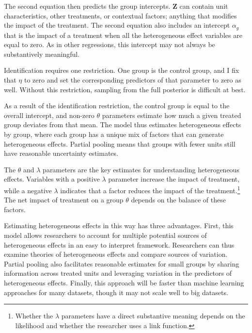 \documentclass[12pt]{article}
\begin{document}
The second equation then predicts the group intercepts. 
\textbf{Z} can contain unit characteristics, other treatments, or contextual factors; anything that modifies the impact of the treatment. 
The second equation also includes an intercept $\alpha_g$ that is the impact of a treatment when all the heterogeneous effect variables are equal to zero.
As in other regressions, this intercept may not always be substantively meaningful.  


Identification requires one restriction. 
One group is the control group, and I fix that $\eta$ to zero and set the corresponding predictors of that parameter to zero as well. 
Without this restriction, sampling from the full posterior is difficult at best. 


As a result of the identification restriction, the control group is equal to the overall intercept, and non-zero $\theta$ parameters estimate how much a given treated group deviates from that mean. 
The model thus estimates heterogeneous effects by group, where each group has a unique mix of factors that can generate heterogeneous effects. 
Partial pooling means that groups with fewer units still have reasonable uncertainty estimates. 


The $\theta$ and $\lambda$ parameters are the key estimates for understanding heterogeneous effects. 
Variables with a positive $\lambda$ parameter increase the impact of treatment, while a negative $\lambda$ indicates that a factor reduces the impact of the treatment.\footnote{Whether the $\lambda$ parameters have a direct substantive meaning depends on the likelihood and whether the researcher uses a link function.} 
The net impact of treatment on a group $\theta$ depends on the balance of these factors. 


Estimating heterogeneous effects in this way has three advantages.
First, this model allows researchers to account for multiple potential sources of heterogeneous effects in an easy to interpret framework. 
Researchers can thus examine theories of heterogeneous effects and compare sources of variation. 
Partial pooling also facilitates reasonable estimates for small groups by sharing information across treated units and leveraging variation in the predictors of heterogeneous effects. 
Finally, this approach will be faster than machine learning approaches for many datasets, though it may not scale well to big datasets. 
\end{document}
